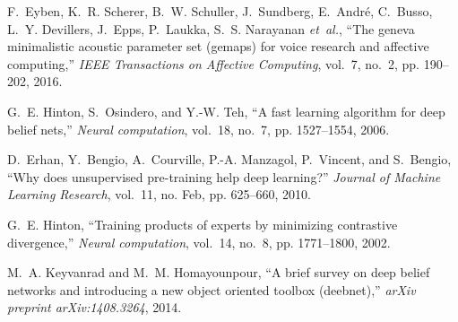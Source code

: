 \documentclass[a4paper]{article}
\begin{document}
\begin{thebibliography}{10}
F.~Eyben, K.~R. Scherer, B.~W. Schuller, J.~Sundberg, E.~Andr{\'e}, C.~Busso,
  L.~Y. Devillers, J.~Epps, P.~Laukka, S.~S. Narayanan \emph{et~al.}, ``The
  geneva minimalistic acoustic parameter set (gemaps) for voice research and
  affective computing,'' \emph{IEEE Transactions on Affective Computing},
  vol.~7, no.~2, pp. 190--202, 2016.

G.~E. Hinton, S.~Osindero, and Y.-W. Teh, ``A fast learning algorithm for deep
  belief nets,'' \emph{Neural computation}, vol.~18, no.~7, pp. 1527--1554,
  2006.

D.~Erhan, Y.~Bengio, A.~Courville, P.-A. Manzagol, P.~Vincent, and S.~Bengio,
  ``Why does unsupervised pre-training help deep learning?'' \emph{Journal of
  Machine Learning Research}, vol.~11, no. Feb, pp. 625--660, 2010.

G.~E. Hinton, ``Training products of experts by minimizing contrastive
  divergence,'' \emph{Neural computation}, vol.~14, no.~8, pp. 1771--1800,
  2002.

M.~A. Keyvanrad and M.~M. Homayounpour, ``A brief survey on deep belief
  networks and introducing a new object oriented toolbox (deebnet),''
  \emph{arXiv preprint arXiv:1408.3264}, 2014.

\end{thebibliography}
\end{document}

